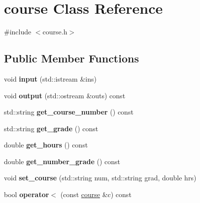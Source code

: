 \hypertarget{classcourse}{}\section{course Class Reference}
\label{classcourse}


{\ttfamily \#include $<$course.\+h$>$}

\subsection*{Public Member Functions}
\begin{DoxyCompactItemize}
\item 
\mbox{\label{classcourse_a0a8839f2369903101399bca60547aed2}} 
void {\bfseries input} (std\+::istream \&ins)
\item 
\mbox{\label{classcourse_afdd5ccf71bbbb7797b75854f16bf373f}} 
void {\bfseries output} (std\+::ostream \&outs) const
\item 
\mbox{\label{classcourse_a8b2f74ab01eae52d779979887fc3b079}} 
std\+::string {\bfseries get\+\_\+course\+\_\+number} () const
\item 
\mbox{\label{classcourse_a5008b6a7c44047fefa1c7779b771aad4}} 
std\+::string {\bfseries get\+\_\+grade} () const
\item 
\mbox{\label{classcourse_a09f7b2b40cbbb81c94e0642d5b13663e}} 
double {\bfseries get\+\_\+hours} () const
\item 
\mbox{\label{classcourse_aad43a6b7ce264bd4038472fc3e40cf16}} 
double {\bfseries get\+\_\+number\+\_\+grade} () const
\item 
\mbox{\label{classcourse_a1fce1a16efb3f07d0da5daca8005e4a6}} 
void {\bfseries set\+\_\+course} (std\+::string num, std\+::string grad, double hrs)
\item 
\mbox{\label{classcourse_aa47eab66d21e10a44ff77f634406face}} 
bool {\bfseries operator$<$} (const \mbox{\hyperlink{classcourse}{course}} \&c) const
\item 
\mbox{\label{classcourse_ab96de818d7b97e4e259fc6add5e0bc54}} 

\end{DoxyCompactItemize}
